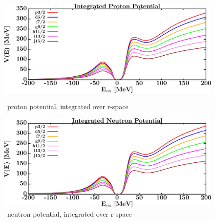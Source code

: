 \begin{figure}[H]
    \centering
    \begin{minipage}{0.45\textwidth}
        \centering
        \includegraphics[width=1.0\textwidth]{figures/o16_protonVolumeIntegrals.png}
        \caption{\oSix\ proton potential, integrated over r-space}
        \label{DOMFitData_o16_proton_potentialIntegral}
    \end{minipage}\hfill
    \begin{minipage}{0.45\textwidth}
        \centering
        \includegraphics[width=1.0\textwidth]{figures/o16_neutronVolumeIntegrals.png}
        \caption{\oSix\ neutron potential, integrated over r-space}
        \label{DOMFitData_o16_neutron_potentialIntegral}
    \end{minipage}
\end{figure}

\afterpage{\clearpage}

